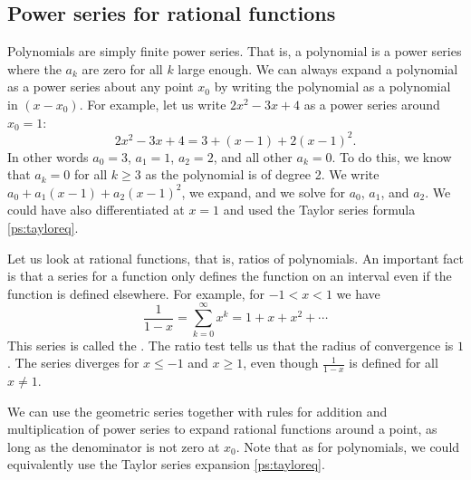 \documentclass[12pt]{book}
\begin{document}
\subsection{Power series for rational functions}

Polynomials are simply finite power series.  That is, a polynomial
is a power series where
the $a_k$ are zero for all $k$ large enough.  We can always expand
a polynomial as a power series about any point $x_0$ by writing
the polynomial as a polynomial in $(x-x_0)$.  For example,
let us write
$2x^2-3x+4$ as a power series around $x_0 = 1$:
\begin{equation*}
2x^2-3x+4 = 3 + (x-1) + 2{(x-1)}^2 .
\end{equation*}
In other words $a_0 = 3$, $a_1 = 1$, $a_2 = 2$, and all other
$a_k = 0$.  To do this, we know that $a_k = 0$ for all $k \geq 3$ as the
polynomial is of degree 2.
We write $a_0 + a_1(x-1) + a_2{(x-1)}^2$, we expand, and we solve
for $a_0$, $a_1$, and $a_2$.  We could have also differentiated at $x=1$
and used the Taylor series formula \eqref{ps:tayloreq}.

Let us look at rational functions, that is, ratios of polynomials.
An important fact is 
that a series for a function only defines the function
on an interval even if the function is defined elsewhere.  For example, for
$-1 < x < 1$ we have
\begin{equation*}
\frac{1}{1-x} =
\sum_{k=0}^\infty x^k =
1 + x + x^2 + \cdots
\end{equation*}
This series is called the \emph{}.  The ratio
test tells us that the radius of convergence is $1$.  The series
diverges for $x \leq -1$ and $x \geq 1$, even though
$\frac{1}{1-x}$ is defined for all $x \not= 1$.

We can use the geometric series together with rules for addition and
multiplication of power series to expand rational functions around
a point, as long as the denominator is not zero at $x_0$.  Note that
as for polynomials, we could
equivalently use the Taylor series expansion \eqref{ps:tayloreq}.
\end{document}
